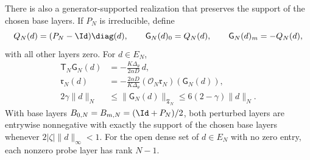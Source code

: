 \begin{theorem}
There is also a generator-supported realization that preserves the support of
the chosen base layers.
If \(P_N\) is irreducible, define
\begin{equation}
 Q_N(d)=(P_N-\Id)\diag(d),\qquad
 \mathsf G_N(d)_0=Q_N(d),\qquad
 \mathsf G_N(d)_m=-Q_N(d),                           \label{eq:tomography-generator-probe}
\end{equation}
with all other layers zero.  For \(d\in E_N\),
\begin{align}
 \mathsf T_N\mathsf G_N(d)
 &=-\frac{K\Delta_\theta}{2\alpha D}\,d,            \label{eq:tomography-generator-identity}\\
 \mathfrak r_N(d)
 &=-\frac{2\alpha D}{K\Delta_\theta}
       (\mathcal O_N\mathfrak r_N)(\mathsf G_N(d)), \label{eq:tomography-generator-reconstruction}\\
 2\gamma\|d\|_N
 &\le \|\mathsf G_N(d)\|_{\mathfrak T_N}
 \le6(2-\gamma)\|d\|_N.                            \label{eq:tomography-generator-condition}
\end{align}
With base layers
\(B_{0,N}=B_{m,N}=(\Id+P_N)/2\), both perturbed layers are entrywise
nonnegative with exactly the support of the chosen base layers whenever
\(2|\zeta|\|d\|_\infty<1\).  For the open dense set of
\(d\in E_N\) with no zero entry, each nonzero probe layer has rank \(N-1\).
\end{theorem}

